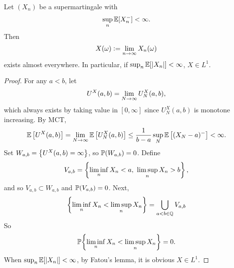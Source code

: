 \begin{thm}
    Let $(X_n)$ be a supermartingale with
    \begin{equation*}
        \sup_n \mathbb{E}[X_n^-] < \infty.
    \end{equation*}
    Then
    \begin{equation*}
        X(\omega) \vcentcolon= \lim_{n \rightarrow \infty}X_n(\omega)
    \end{equation*}
    exists almost everywhere. In particular, if $\sup_n \mathbb{E}[\left\lvert X_n\right\lvert] < \infty$, $X \in L^1$.
\end{thm}
\begin{proof}
    For any $a < b$, let
    \begin{equation*}
        U^X(a,b) = \lim_{N \rightarrow \infty} U_N^X(a,b),
    \end{equation*}
    which always exists by taking value in $[0,\infty]$ since $U_N^X(a,b)$ is monotone increasing. By MCT,
    \begin{equation*}
        \mathbb{E}\left[U^X(a,b)\right] = \lim_{N \rightarrow \infty} \mathbb{E}\left[U_N^X(a,b)\right] \leq \frac{1}{b-a}\sup_{N} \mathbb{E}\left[(X_N-a)^-\right] < \infty.
    \end{equation*}
    Set $W_{a,b} = \left\{U^X(a,b) = \infty\right\}$, so $\mathbb{P}(W_{a,b}) = 0$. Define
    \begin{equation*}
        V_{a,b} = \left\{\liminf_n X_n < a,~\limsup_n X_n > b\right\},
    \end{equation*}
    and so $V_{a,b} \subset W_{a,b}$ and $\mathbb{P}(V_{a,b}) = 0$. Next,
    \begin{equation*}
        \left\{\liminf_n X_n < \limsup_n X_n\right\} = \bigcup_{a < b \in \mathbb{Q}}V_{a,b}
    \end{equation*}
    So
    \begin{equation*}
        \mathbb{P}{\left\{\liminf_n X_n < \limsup_n X_n\right\}} = 0. 
    \end{equation*}
    When $\sup_n \mathbb{E}[\left\lvert X_n\right\lvert] < \infty$, by Fatou's lemma, it is obvious $X \in L^1$.
\end{proof}

